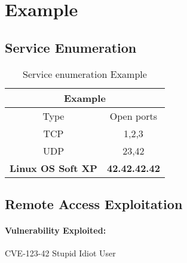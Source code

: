 
\renewcommand{\hostname}{Example}
\renewcommand{\os}{Linux OS Soft XP}
\renewcommand{\ip}{42.42.42.42}
\renewcommand{\tcpports}{1,2,3}
\renewcommand{\udpports}{23,42}
\renewcommand{\vuln}{CVE-123-42 \glqq Stupid Idiot User\grqq}
\renewcommand{\product}{Human}
\renewcommand{\vulnx}{CVE-123-43 \glqq Very Stupid Idiot User Again\grqq} 
\renewcommand{\productx}{Human}
\def\root{}   %



\section{\hostname}
\subsection{Service Enumeration}

\begin{table}[h]
	\begin{tabular}{|c|c|}
		\hline
		\multicolumn{2}{|c|}{\textbf{\hostname}}\\\hline\hline
		Type         & Open ports   \\\hline
		TCP          & \tcpports{}  \\\hline
		UDP          & \udpports{}  \\\hline\hline
		\textbf{\os} & \textbf{\ip} \\\hline
	\end{tabular}
	\caption{Service enumeration \hostname}
\end{table}

\subsection{Remote Access Exploitation}

\paragraph{Vulnerability Exploited:}
\vuln

